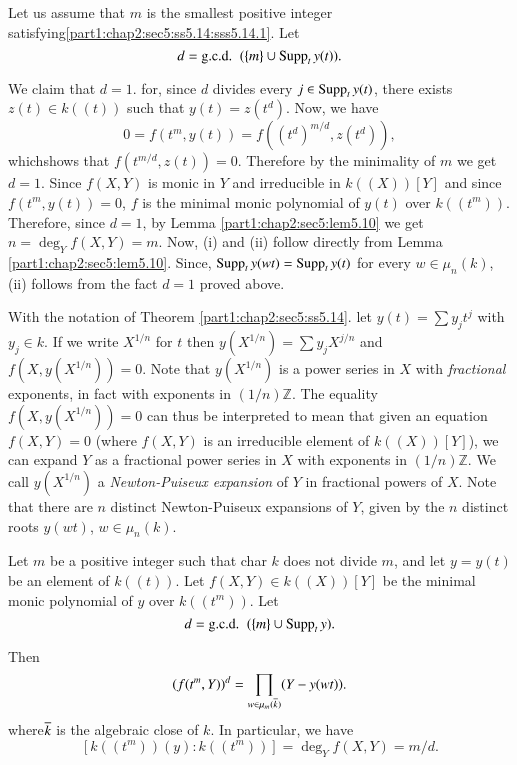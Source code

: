 Let us assume that $m$ is the smallest positive integer satisfying\break \ref{part1:chap2:sec5:ss5.14:sss5.14.1}. Let
$$
d= \text{{g.c.d.}\kern.3em}~ (\{ m\} \cup \operatorname{Supp}_t y(t)).
$$

We claim that $d=1$. for, since $d$ divides every $j \in \operatorname{Supp}_t y(t)$, there exists $z (t) \in k((t))$ such that $y(t)= z(t^d)$. Now, we have
$$
0 = f(t^m, y(t)) = f((t^d)^{m/d}, z(t^d)),
$$
which\pageoriginale shows that $f(t^{m/d}, z(t))=0$. Therefore by the minimality of $m$ we get $d=1$. Since $f(X, Y)$ is monic in $Y$ and irreducible in $k((X))[Y]$ and since $f(t^m, y(t))=0$, $f$ is the minimal monic polynomial of $y(t)$ over $k((t^m))$. Therefore, since $d=1$, by Lemma \ref{part1:chap2:sec5:lem5.10} we get $n= \deg_Y f(X, Y)=m$. Now, (i) and (ii) follow directly from Lemma \ref{part1:chap2:sec5:lem5.10}. Since, $\operatorname{Supp}_t y(wt)= \operatorname{Supp}_t y(t)$ for every $w \in \mu_n (k)$, (ii) follows from the fact $d=1$ proved above.

\setcounter{thm}{14}
\begin{remark}\label{part1:chap2:sec5:rem5.15}
  With the notation of Theorem \ref{part1:chap2:sec5:ss5.14}. let $y(t) = \sum y_j t^j$ with $y_j \in k$. If we write $X^{1/n}$ for $t$ then $y(X^{1/n})= \sum y_j X^{j/n}$ and $f(X, y(X^{1/n}))=0$. Note that $y(X^{1/n})$ is a power series in $X$ with {\em fractional} exponents, in fact with exponents in $(1/n)\mathbb{Z}$. The equality $f(X, y(X^{1/n}))=0$ can thus be interpreted to mean that given an equation $f(X, Y)=0$ (where $f(X, Y)$ is an irreducible element of $k((X)) [Y]$), we can expand $Y$ as a fractional power series in $X$ with exponents in $(1/n)\mathbb{Z}$. We call $y(X^{1/n})$ a {\em Newton-Puiseux expansion} of $Y$ in fractional powers of $X$. Note that there are $n$ distinct Newton-Puiseux expansions of $Y$, given by the $n$ distinct roots $y(wt)$, $w \in \mu_n(k)$.
\end{remark}

\begin{prop}\label{part1:chap2:sec5:prop5.16}
  Let $m$ be a positive integer such that char $k$ does not divide $m$, and let $y= y(t)$ be an element of $k((t))$. Let $f(X, Y) \in k ((X)) [Y]$ be the minimal monic polynomial of $y$ over $k((t^m))$. Let
$$
d = \text{{g.c.d.}\kern.3em}~ ( \{ m\} \cup \operatorname{Supp}_t y).
$$
\end{prop}

Then 
$$
(f(t^m, Y))^d = \prod_{w \in \mu_m (\overline{k})} (Y- y(wt)).
$$
where\pageoriginale $\overline{k}$ is the algebraic close of $k$. In particular, we 
have 
$$
[k((t^m)) (y): k((t^m))]= \deg_Y f(X, Y) = m/d.
$$

